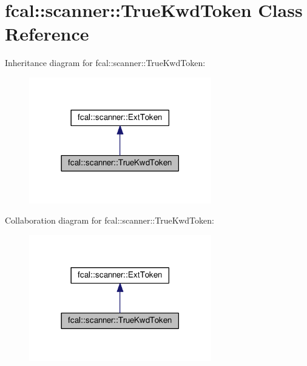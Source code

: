 \hypertarget{classfcal_1_1scanner_1_1TrueKwdToken}{}\section{fcal\+:\+:scanner\+:\+:True\+Kwd\+Token Class Reference}
\label{classfcal_1_1scanner_1_1TrueKwdToken}


Inheritance diagram for fcal\+:\+:scanner\+:\+:True\+Kwd\+Token\+:\nopagebreak
\begin{figure}[H]
\begin{center}
\leavevmode
\includegraphics[width=225pt]{classfcal_1_1scanner_1_1TrueKwdToken__inherit__graph}
\end{center}
\end{figure}


Collaboration diagram for fcal\+:\+:scanner\+:\+:True\+Kwd\+Token\+:\nopagebreak
\begin{figure}[H]
\begin{center}
\leavevmode
\includegraphics[width=225pt]{classfcal_1_1scanner_1_1TrueKwdToken__coll__graph}
\end{center}
\end{figure}
